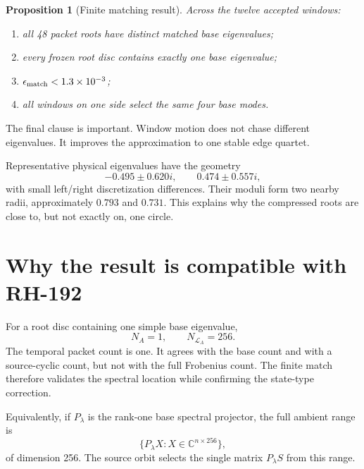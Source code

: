\documentclass[12pt]{article}
\newtheorem{proposition}[theorem]{Proposition}
\theoremstyle{remark}
\begin{document}
\begin{proposition}[Finite matching result]\label{prop:matching}
Across the twelve accepted windows:
\begin{enumerate}[leftmargin=2em]
\item all 48 packet roots have distinct matched base eigenvalues;
\item every frozen root disc contains exactly one base eigenvalue;
\item $\epsilon_{\rm match}<1.3\times10^{-3}$;
\item all windows on one side select the same four base modes.
\end{enumerate}
\end{proposition}

The final clause is important.  Window motion does not chase different
eigenvalues.  It improves the approximation to one stable edge quartet.

Representative physical eigenvalues have the geometry
\begin{equation}\label{eq:quartet-geometry}
 -0.495\pm0.620i,
 \qquad
 0.474\pm0.557i,
\end{equation}
with small left/right discretization differences.  Their moduli form two
nearby radii, approximately $0.793$ and $0.731$.  This explains why the
compressed roots are close to, but not exactly on, one circle.

\section{Why the result is compatible with RH-192}

For a root disc containing one simple base eigenvalue,
\begin{equation}\label{eq:counts}
 N_A=1,
 \qquad N_{\mathcal L_A}=256.
\end{equation}
The temporal packet count is one.  It agrees with the base count and with a
source-cyclic count, but not with the full Frobenius count.  The finite match
therefore validates the spectral location while confirming the state-type
correction.

Equivalently, if $P_\lambda$ is the rank-one base spectral projector, the
full ambient range is
\begin{equation}\label{eq:ambient-range}
 \{P_\lambda X:X\in\mathbb C^{n\times256}\},
\end{equation}
of dimension 256.  The source orbit selects the single matrix
$P_\lambda S$ from this range.
\end{document}
